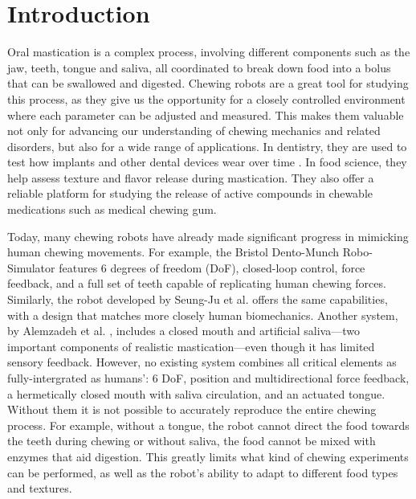 \section{Introduction}


Oral mastication is a complex process, involving different components such as the jaw, teeth, tongue and saliva, all coordinated to break down food into 
a bolus that can be swallowed and digested. Chewing robots are a great tool for studying this process, as they give us the opportunity for a closely controlled environment where each parameter can be adjusted and measured. This makes them valuable not only for advancing our understanding of chewing mechanics and related disorders, but also for a wide range of applications. In dentistry, they are used to test how implants and other dental devices wear over time \cite{dental_application}. In food science, they help assess texture \cite{foodscience} and flavor release during mastication. They also offer a reliable platform for studying the release of active compounds in chewable medications such as medical chewing gum.

Today, many chewing robots have already made significant progress in mimicking human chewing movements.
For example, the Bristol Dento-Munch Robo-Simulator \cite{BristolChewingRobot} features 6 degrees of freedom 
(DoF), closed-loop control, force feedback, and a full set of teeth capable of replicating human chewing forces. Similarly, the robot developed by Seung-Ju 
et al. \cite{ChewingRobotLinearActuator} offers the same capabilities, with a design that matches more closely human biomechanics. Another system, by Alemzadeh 
et al. \cite{ChewingRobotGums}, includes a closed mouth and artificial saliva—two important components of realistic mastication—even though it has limited 
sensory feedback. However, no existing system combines all critical elements as fully-intergrated as humans': 6 DoF, position and multidirectional force feedback, a hermetically closed 
mouth with saliva circulation, and an actuated tongue. Without them it is not possible to accurately reproduce the entire chewing process. For example, without 
a tongue, the robot cannot direct the food towards the teeth during chewing or without saliva, the food cannot be mixed with enzymes that aid digestion. This greatly 
limits what kind of chewing experiments can be performed, as well as the robot's ability to adapt to different food types and textures.

